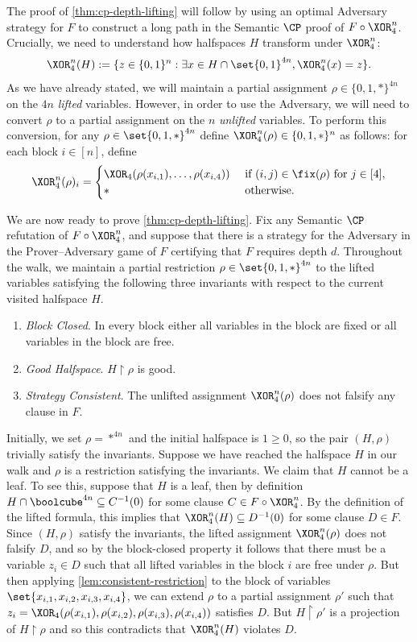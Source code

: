 \documentclass{toc}
\begin{document}
The proof of \autoref{thm:cp-depth-lifting} will follow by using an optimal Adversary strategy for $F$ to construct a long path in the Semantic $\CP$ proof of $F \circ \XOR_4^n$.
Crucially, we need to understand how halfspaces $H$ transform under $\XOR_4^n$:
\[ \XOR_4^n(H):= \{z \in \{0,1\}^n : \exists x \in H \cap \set{0,1}^{4n}, \XOR^n_4(x) = z\}. \]
As we have already stated, we will maintain a partial assignment $\rho \in \{0,1,*\}^{4n}$ on the $4n$ \emph{lifted} variables.
However, in order to use the Adversary, we will need to convert $\rho$ to a partial assignment on the $n$ \emph{unlifted} variables.
To perform this conversion, for any $\rho \in \set{0,1,*}^{4n}$ define $\XOR_4^n(\rho) \in \{0,1,*\}^n$ as follows: for each block $i \in [n]$, define \[ \XOR^n_4(\rho)_i  = \begin{cases}
		\XOR_4(\rho(x_{i,1}),\ldots, \rho(x_{i, 4})) &\mbox{ if $(i,j) \in \fix(\rho)$ for $j \in [4]$}, \\
 		* &\mbox{ otherwise}.
 \end{cases}
 \]

We are now ready to prove \autoref{thm:cp-depth-lifting}.
Fix any Semantic $\CP$ refutation of $F \circ \XOR_4^n$, and suppose that there is a strategy for the Adversary in the Prover--Adversary game of $F$ certifying that $F$ requires depth $d$.
Throughout the walk, we maintain a partial restriction $\rho \in \set{0,1,*}^{4n}$ to the lifted variables satisfying the following three invariants with respect to the current visited halfspace $H$. 
\begin{enumerate}
	\item[--] \emph{Block Closed}. In every block either all variables in the block are fixed or all variables in the block are free.
	\item[--] \emph{Good Halfspace}. $H \restriction \rho$ is good.
	\item[--] \emph{Strategy Consistent}. The unlifted assignment $\XOR_4^n(\rho)$ does not falsify any clause in $F$.
\end{enumerate}
%
%
%
%
%
%
%
%
Initially, we set $\rho = *^{4n}$ and the initial halfspace is $1 \geq 0$, so the pair $(H, \rho)$ trivially satisfy the invariants.
Suppose we have reached the halfspace $H$ in our walk and $\rho$ is a restriction satisfying the invariants.
We claim that $H$ cannot be a leaf.
To see this, suppose that $H$ is a leaf, then by definition $H \cap \boolcube^{4n} \subseteq C^{-1}(0)$ for some clause $C \in F \circ \XOR^n_4$. 
By the definition of the lifted formula, this implies that $\XOR^n_4(H) \subseteq D^{-1}(0)$ for some clause $D \in F$.
Since $(H, \rho)$ satisfy the invariants, the lifted assignment $\XOR_4^n(\rho)$ does not falsify $D$, and so by the block-closed property it follows that there must be a variable $z_i \in D$ such that all lifted variables in the block $i$ are free under $\rho$.
But then applying \autoref{lem:consistent-restriction} to the block of variables $\set{x_{i,1}, x_{i,2}, x_{i,3}, x_{i,4}}$, we can extend $\rho$ to a partial assignment $\rho'$ such that $z_i = \XOR_4(\rho(x_{i,1}), \rho(x_{i,2}), \rho(x_{i,3}), \rho(x_{i,4}))$ satisfies $D$.
But $H \restriction \rho'$ is a projection of $H \restriction \rho$ and so this contradicts that $\XOR^n_4(H)$ violates $D$.
\end{document}
